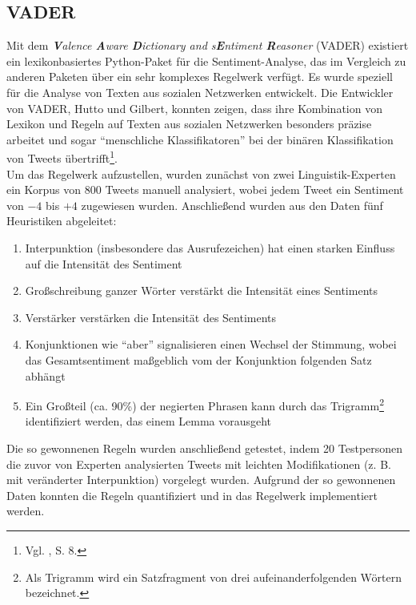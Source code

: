 \documentclass[
	a4paper,
	12pt,
	bibliography=totocnumbered,
	twoside,
]{scrreprt}
\begin{document}
\subsection*{VADER}
Mit dem \textit{\textbf{V}alence \textbf{A}ware \textbf{D}ictionary and s\textbf{E}ntiment \textbf{R}easoner} (VADER) existiert ein lexikonbasiertes Python-Paket für die Sentiment-Analyse, das im Vergleich zu anderen Paketen über ein sehr komplexes Regelwerk verfügt. Es wurde speziell für die Analyse von Texten aus sozialen Netzwerken entwickelt. Die Entwickler von VADER, Hutto und Gilbert, konnten zeigen, dass ihre Kombination von Lexikon und Regeln auf Texten aus sozialen Netzwerken besonders präzise arbeitet und sogar "`menschliche Klassifikatoren"' bei der binären Klassifikation von Tweets übertrifft\footnote{Vgl. \citet{hutto2014}, S. 8.}.\\

Um das Regelwerk aufzustellen, wurden zunächst von zwei Linguistik-Experten ein Korpus von 800 Tweets manuell analysiert, wobei jedem Tweet ein Sentiment von $-4$ bis $+4$ zugewiesen wurden. Anschließend wurden aus den Daten fünf Heuristiken abgeleitet:
\begin{enumerate}
    \item Interpunktion (insbesondere das Ausrufezeichen) hat einen starken Einfluss auf die Intensität des Sentiment
    \item Großschreibung ganzer Wörter verstärkt die Intensität eines Sentiments
    \item Verstärker verstärken die Intensität des Sentiments
    \item Konjunktionen wie "`aber"' signalisieren einen Wechsel der Stimmung, wobei das Gesamtsentiment maßgeblich vom der Konjunktion folgenden Satz abhängt
    \item Ein Großteil (ca. 90\%) der negierten Phrasen kann durch das Trigramm\footnote{Als Trigramm wird ein Satzfragment von drei aufeinanderfolgenden Wörtern bezeichnet.} identifiziert werden, das einem Lemma vorausgeht 
\end{enumerate}

Die so gewonnenen Regeln wurden anschließend getestet, indem 20 Testpersonen die zuvor von Experten analysierten Tweets mit leichten Modifikationen (z. B. mit veränderter Interpunktion) vorgelegt wurden. Aufgrund der so gewonnenen Daten konnten die Regeln quantifiziert und in das Regelwerk implementiert werden.\\
\end{document}
